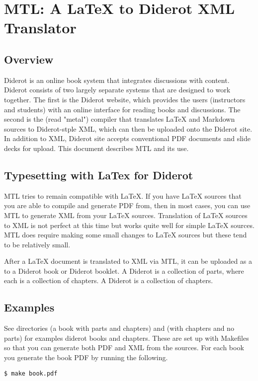 \chapter{MTL: A LaTeX to Diderot XML Translator}
\label{mtl}
 

\section{Overview}
Diderot is an online book system that integrates discussions with content.  Diderot consists of two largely separate systems that are designed to work together.  The first is the Diderot website, which provides the users (instructors and students) with an online interface for reading books and discussions.  The second is the  (read "metal") compiler that translates LaTeX and Markdown sources to Diderot-stple XML, which can then be uploaded onto the Diderot site.  In addition to XML, Diderot site accepts conventional PDF documents and slide decks for upload.  This document describes MTL and its use.  



\section{Typesetting with LaTex for Diderot}

MTL tries to remain compatible with LaTeX.   If you have  LaTeX sources that you are able to compile and generate PDF from, then in most cases, you can use MTL to generate XML from your LaTeX sources.  Translation of LaTeX sources to XML is not perfect at this time but works quite well for simple LaTeX sources.  MTL does require making some small changes to LaTeX sources but these tend to be relatively small. 

After a LaTeX document is translated to XML via MTL, it can be uploaded as a  to a Diderot book or Diderot booklet.  
%
A Diderot  is a collection of parts, where each  is a collection of chapters.
%
A Diderot  is a collection of chapters. 
%


\section{Examples} 


See directories  (a book with parts and chapters) and  (with chapters and no parts) for examples diderot books and chapters.  These are set up with Makefiles so that you can generate both PDF and XML from the sources. For each book you generate the book PDF by running the following.
%
\begin{lstlisting}
$ make book.pdf
\end{lstlisting}


